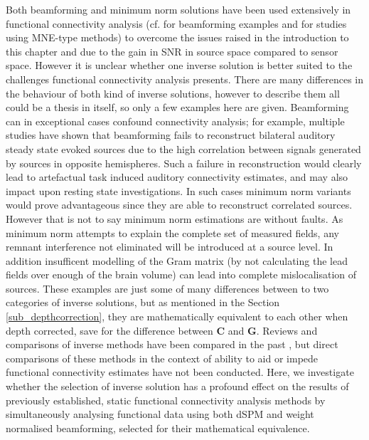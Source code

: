 Both beamforming and minimum norm solutions have been used extensively in functional connectivity analysis (cf. \citealp{Brookes2011,Luckhoo2012,Baker2014,ONeill2015A} for beamforming examples and \citealp{dePasquale2010,Pavla2010,Marzetti2013,Wens2014a} for studies using MNE-type methods) to overcome the issues raised in the introduction to this chapter and due to the gain in SNR in source space compared to sensor space. However it is unclear whether one inverse solution is better suited to the challenges functional connectivity analysis presents. There are many differences in the behaviour of both kind of inverse solutions, however to describe them all could be a thesis in itself, so only a few examples here are given. Beamforming can in exceptional cases confound connectivity analysis; for example, multiple studies have shown that beamforming fails to reconstruct bilateral auditory steady state evoked sources \citep{Dalal2006,Brookes2007,Popescu2008,Diwakar2011} due to the high correlation between signals generated by sources in opposite hemispheres. Such a failure in reconstruction would clearly lead to artefactual task induced auditory connectivity estimates, and may also impact upon resting state investigations. In such cases minimum norm variants would prove advantageous since they are able to reconstruct correlated sources. However that is not to say minimum norm estimations are without  faults. As minimum norm attempts to explain the complete set of measured fields, any remnant interference not eliminated will be introduced at a source level. In addition insufficent modelling of the Gram matrix (by not calculating the lead fields over enough of the brain volume) can lead into complete mislocalisation of sources.  These examples are just some of many differences between to two categories of inverse solutions, but as mentioned in the Section \ref{sub_depthcorrection}, they are mathematically equivalent to each other when depth corrected, save for the difference between \textbf{C} and \textbf{G}. Reviews and comparisons of inverse methods have been compared in the past \citep{Mosher2003,Scoffelen2009,Hauk2011}, but direct comparisons of these methods in the context of ability to aid or impede functional connectivity estimates have not been conducted. Here, we investigate whether the selection of inverse solution has a profound effect on the results of previously established, static functional connectivity analysis methods \citep{Brookes2011,Luckhoo2012,Hall2013} by simultaneously analysing functional data using both dSPM and weight normalised beamforming, selected for their mathematical equivalence.

